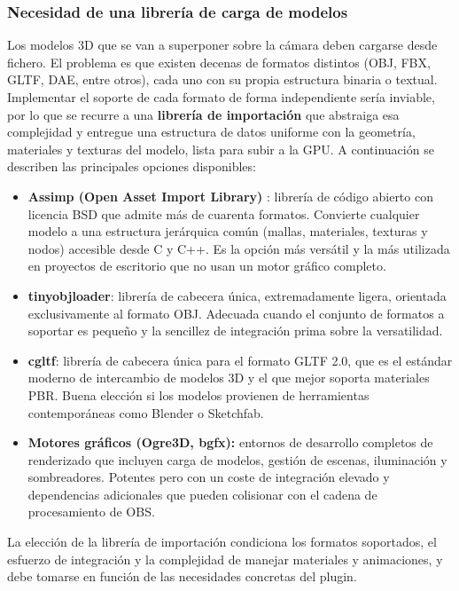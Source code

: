 \subsubsection*{Necesidad de una librería de carga de modelos}

Los modelos 3D que se van a superponer sobre la cámara deben cargarse desde fichero. El problema es que existen decenas de formatos distintos (OBJ, FBX, GLTF, DAE, entre otros), cada uno con su propia estructura binaria o textual. Implementar el soporte de cada formato de forma independiente sería inviable, por lo que se recurre a una \textbf{librería de importación} que abstraiga esa complejidad y entregue una estructura de datos uniforme con la geometría, materiales y texturas del modelo, lista para subir a la GPU. A continuación se describen las principales opciones disponibles:

\begin{itemize}
    \item \textbf{Assimp (Open Asset Import Library)} \cite{assimp_github}: librería de código abierto con licencia BSD que admite más de cuarenta formatos. Convierte cualquier modelo a una estructura jerárquica común (mallas, materiales, texturas y nodos) accesible desde C y C++. Es la opción más versátil y la más utilizada en proyectos de escritorio que no usan un motor gráfico completo.
    \item \textbf{tinyobjloader}: librería de cabecera única, extremadamente ligera, orientada exclusivamente al formato OBJ. Adecuada cuando el conjunto de formatos a soportar es pequeño y la sencillez de integración prima sobre la versatilidad.
    \item \textbf{cgltf}: librería de cabecera única para el formato GLTF 2.0, que es el estándar moderno de intercambio de modelos 3D y el que mejor soporta materiales PBR. Buena elección si los modelos provienen de herramientas contemporáneas como Blender o Sketchfab.
    \item \textbf{Motores gráficos (Ogre3D, bgfx):} entornos de desarrollo completos de renderizado que incluyen carga de modelos, gestión de escenas, iluminación y sombreadores. Potentes pero con un coste de integración elevado y dependencias adicionales que pueden colisionar con el cadena de procesamiento de OBS.
\end{itemize}

La elección de la librería de importación condiciona los formatos soportados, el esfuerzo de integración y la complejidad de manejar materiales y animaciones, y debe tomarse en función de las necesidades concretas del plugin.

